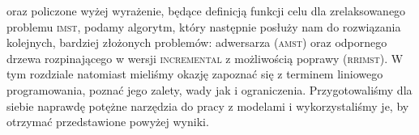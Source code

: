 oraz policzone wyżej wyrażenie, będące definicją funkcji celu dla zrelaksowanego problemu \textsc{imst}, podamy algorytm, który następnie posłuży nam do rozwiązania kolejnych, bardziej złożonych problemów: adwersarza (\textsc{amst}) oraz odpornego drzewa rozpinającego w wersji \textsc{incremental} z możliwością poprawy (\textsc{rrimst}). W tym rozdziale natomiast mieliśmy okazję zapoznać się z terminem liniowego programowania, poznać jego zalety, wady jak i ograniczenia. Przygotowaliśmy dla siebie naprawdę potężne narzędzia do pracy z modelami i wykorzystaliśmy je, by otrzymać przedstawione powyżej wyniki.